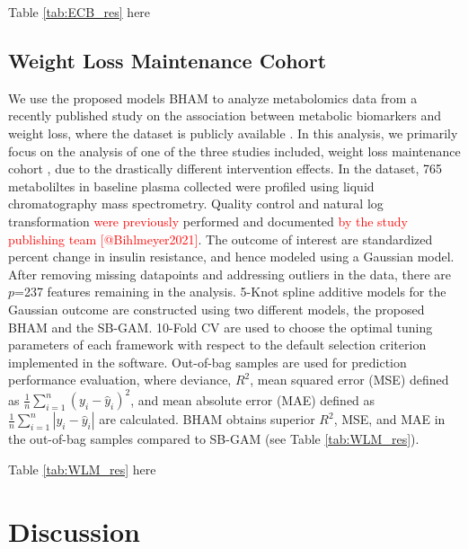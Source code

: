 \documentclass[AMA,STIX1COL,]{WileyNJD-v2}
\begin{document}
\begin{center}
Table \ref{tab:ECB_res} here
\end{center}

\subsection{Weight Loss Maintenance Cohort}

We use the proposed models BHAM to analyze metabolomics data from a
recently published study \citep{Bihlmeyer2021} on the association
between metabolic biomarkers and weight loss, where the dataset is
publicly available \citep{Bihlmeyer2021_data}. In this analysis, we
primarily focus on the analysis of one of the three studies included,
weight loss maintenance cohort \citep{Svetkey2008}, due to the
drastically different intervention effects. In the dataset, 765
metaboliltes in baseline plasma collected were profiled using liquid
chromatography mass spectrometry. Quality control and natural log
transformation \textcolor{red}{were previously} performed and documented
\textcolor{red}{by the study publishing team [@Bihlmeyer2021]}. The
outcome of interest are standardized percent change in insulin
resistance, and hence modeled using a Gaussian model. After removing
missing datapoints and addressing outliers in the data, there are
\(p\)=237 features remaining in the analysis. 5-Knot spline additive
models for the Gaussian outcome are constructed using two different
models, the proposed BHAM and the SB-GAM. 10-Fold CV are used to choose
the optimal tuning parameters of each framework with respect to the
default selection criterion implemented in the software. Out-of-bag
samples are used for prediction performance evaluation, where deviance,
\(R^2\), mean squared error (MSE) defined as
\(\frac{1}{n}\sum\limits^{n}_{i=1}(y_i - \hat y_i)^2\), and mean
absolute error (MAE) defined as
\(\frac{1}{n}\sum\limits^{n}_{i=1}|y_i - \hat y_i|\) are calculated.
BHAM obtains superior \(R^2\), MSE, and MAE in the out-of-bag samples
compared to SB-GAM (see Table \ref{tab:WLM_res}).

\begin{center}
Table \ref{tab:WLM_res} here
\end{center}

\section{Discussion}
\label{sec:concl}
\end{document}
